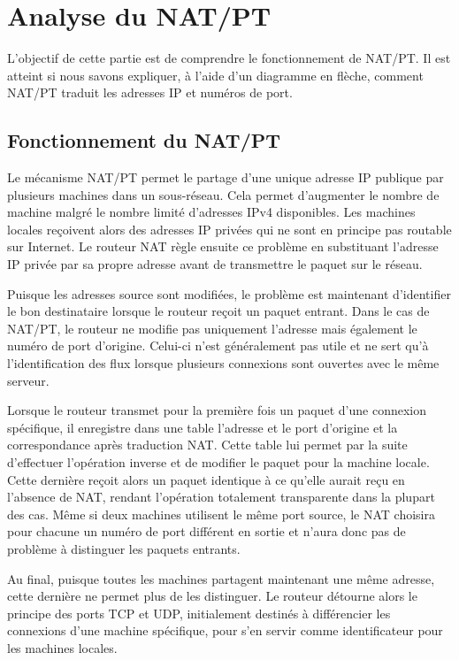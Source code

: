 \documentclass[11pt,a4paper]{article}
\begin{document}
\section{Analyse du NAT/PT}

L'objectif de cette partie est de comprendre le fonctionnement de NAT/PT. Il est atteint si nous savons expliquer, à l'aide d'un diagramme en flèche, comment NAT/PT traduit les adresses IP et numéros de port.

\subsection{Fonctionnement du NAT/PT}

Le mécanisme NAT/PT permet le partage d'une unique adresse IP publique par plusieurs machines dans un sous-réseau. Cela permet d'augmenter le nombre de machine malgré le nombre limité d'adresses IPv4 disponibles.
Les machines locales reçoivent alors des adresses IP privées qui ne sont en principe pas routable sur Internet. Le routeur NAT règle ensuite ce problème en substituant l'adresse IP privée par sa propre adresse avant de transmettre le paquet sur le réseau. 

Puisque les adresses source sont modifiées, le problème est maintenant d'identifier le bon destinataire lorsque le routeur reçoit un paquet entrant.
Dans le cas de NAT/PT, le routeur ne modifie pas uniquement l'adresse mais également le numéro de port d'origine. Celui-ci n'est généralement pas utile et ne sert qu'à l'identification des flux lorsque plusieurs connexions sont ouvertes avec le même serveur.

Lorsque le routeur transmet pour la première fois un paquet d'une connexion spécifique, il enregistre dans une table l'adresse et le port d'origine et la correspondance après traduction NAT. Cette table lui permet par la suite d'effectuer l'opération inverse et de modifier le paquet pour la machine locale. Cette dernière reçoit alors un paquet identique à ce qu'elle aurait reçu en l'absence de NAT, rendant l'opération totalement transparente dans la plupart des cas. Même si deux machines utilisent le même port source, le NAT choisira pour chacune un numéro de port différent en sortie et n'aura donc pas de problème à distinguer les paquets entrants.

Au final, puisque toutes les machines partagent maintenant une même adresse, cette dernière ne permet plus de les distinguer. Le routeur détourne alors le principe des ports TCP et UDP, initialement destinés à différencier les connexions d'une machine spécifique, pour s'en servir comme identificateur pour les machines locales.
\end{document}
